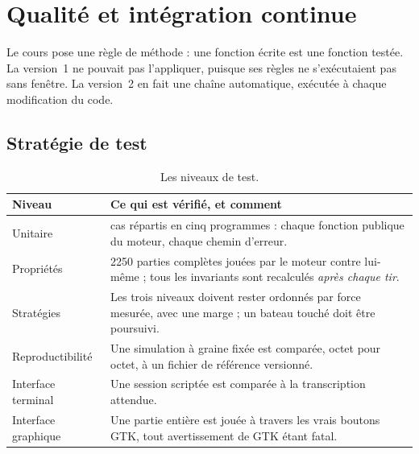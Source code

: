 \chapter{Qualité et intégration continue}
\label{chap-qualite}

Le cours pose une règle de méthode : une fonction écrite est une fonction testée. La
version~1 ne pouvait pas l'appliquer, puisque ses règles ne s'exécutaient pas sans fenêtre.
La version~2 en fait une chaîne automatique, exécutée à chaque modification du code.

\section{Stratégie de test}

\begin{table}[ht]
    \centering
    \small
    \begin{tabularx}{\textwidth}{@{}l>{\raggedright\arraybackslash}X@{}}
        \toprule
        \textbf{Niveau}     & \textbf{Ce qui est vérifié, et comment}                                  \\
        \midrule
        Unitaire            & 54 cas répartis en cinq programmes : chaque fonction publique du moteur,
        chaque chemin d'erreur.                                                                        \\
        \addlinespace
        Propriétés          & \num{2250} parties complètes jouées par le moteur contre lui-même ; tous
        les invariants sont recalculés \emph{après chaque tir}.                                        \\
        \addlinespace
        Stratégies          & Les trois niveaux doivent rester ordonnés par force mesurée, avec une
        marge ; un bateau touché doit être poursuivi.                                                  \\
        \addlinespace
        Reproductibilité    & Une simulation à graine fixée est comparée, octet pour octet, à un
        fichier de référence versionné.                                                                \\
        \addlinespace
        Interface terminal  & Une session scriptée est comparée à la transcription attendue.           \\
        \addlinespace
        Interface graphique & Une partie entière est jouée à travers les vrais boutons GTK,
        tout avertissement de GTK étant fatal.                                                         \\
        \bottomrule
    \end{tabularx}
    \caption{Les niveaux de test.}
    \label{tab-tests}
\end{table}


